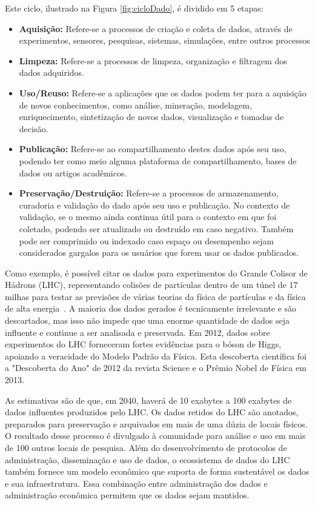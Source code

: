 \documentclass[portugues]{ic-tese}
\begin{document}
Este ciclo, ilustrado na Figura \ref{fig:cicloDado}, é dividido em 5 etapas:

\begin{itemize}
\item \textbf{Aquisição:} Refere-se a processos de criação e coleta de dados, através de experimentos, sensores, pesquisas, sistemas, simulações, entre outros processos
\item \textbf{Limpeza:} Refere-se a processos de limpeza, organização e filtragem dos dados adquiridos.
\item \textbf{Uso/Reuso:} Refere-se a aplicações que os dados podem ter para a aquisição de novos conhecimentos, como análise, mineração, modelagem, enriquecimento, sintetização de novos dados, visualização e tomadas de decisão.
\item \textbf{Publicação:} Refere-se ao compartilhamento destes dados após seu uso, podendo ter como meio alguma plataforma de compartilhamento, bases de dados ou artigos acadêmicos.
\item \textbf{Preservação/Destruição:} Refere-se a processos de armazenamento, curadoria e validação do dado após seu uso e publicação. No contexto de validação, se o mesmo ainda continua útil para o contexto em que foi coletado, podendo ser atualizado ou destruído em caso negativo. Também pode ser comprimido ou indexado caso espaço ou desempenho sejam considerados gargalos para os usuários que forem usar os dados publicados.
\end{itemize}

Como exemplo, é possível citar os dados para experimentos do Grande Colisor de Hádrons (LHC), representando colisões de partículas dentro de um túnel de 17 milhas para testar as previsões de várias teorias da física de partículas e da física de alta energia~\citep{Berman_2018}. A maioria dos dados gerados é tecnicamente irrelevante e são descartados, mas isso não impede que uma enorme quantidade de dados seja influente e continue a ser analisada e preservada. Em 2012, dados sobre experimentos do LHC forneceram fortes evidências para o bóson de Higgs, apoiando a veracidade do Modelo Padrão da Física. Esta descoberta científica foi a "Descoberta do Ano" de 2012 da revista Science e o Prêmio Nobel de Física em 2013.

As estimativas são de que, em 2040, haverá de 10 exabytes a 100 exabytes de dados influentes produzidos pelo LHC. Os dados retidos do LHC são anotados, preparados para preservação e arquivados em mais de uma dúzia de locais físicos. O resultado desse processo é divulgado à comunidade para análise e uso em mais de 100 outros locais de pesquisa. Além do desenvolvimento de protocolos de administração, disseminação e uso de dados, o ecossistema de dados do LHC também fornece um modelo econômico que suporta de forma sustentável os dados e sua infraestrutura. Essa combinação entre administração dos dados e administração econômica permitem que os dados sejam mantidos.
\end{document}
